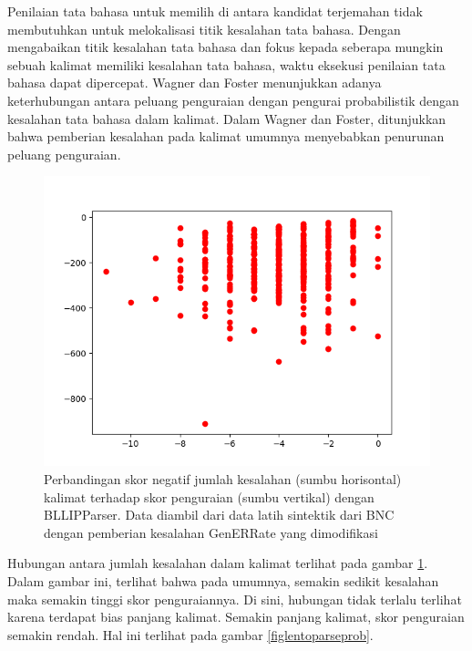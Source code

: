 \documentclass[conference]{IEEEtran}
\begin{document}
Penilaian tata bahasa untuk memilih di antara kandidat terjemahan tidak membutuhkan untuk melokalisasi titik kesalahan tata bahasa. Dengan mengabaikan titik kesalahan tata bahasa dan fokus kepada seberapa mungkin sebuah kalimat memiliki kesalahan tata bahasa, waktu eksekusi penilaian tata bahasa dapat dipercepat. Wagner dan Foster \cite{b4} menunjukkan adanya keterhubungan antara peluang penguraian dengan pengurai probabilistik dengan kesalahan tata bahasa dalam kalimat. Dalam Wagner dan Foster\cite{b4}, ditunjukkan bahwa pemberian kesalahan pada kalimat umumnya menyebabkan penurunan peluang penguraian.

\begin{figure}[h]
\centerline{\includegraphics[width=\columnwidth]{figures/figscoretoparseprob.png}}
\caption{Perbandingan skor negatif jumlah kesalahan (sumbu horisontal) kalimat terhadap skor penguraian (sumbu vertikal) dengan BLLIPParser. Data diambil dari data latih sintektik dari BNC dengan pemberian kesalahan GenERRate yang dimodifikasi}
\label{figscoretoparseprob}
\end{figure}

Hubungan antara jumlah kesalahan dalam kalimat terlihat pada gambar \ref{figscoretoparseprob}. Dalam gambar ini, terlihat bahwa pada umumnya, semakin sedikit kesalahan maka semakin tinggi skor penguraiannya. Di sini, hubungan tidak terlalu terlihat karena terdapat bias panjang kalimat. Semakin panjang kalimat, skor penguraian semakin rendah. Hal ini terlihat pada gambar \ref{figlentoparseprob}.
\end{document}
